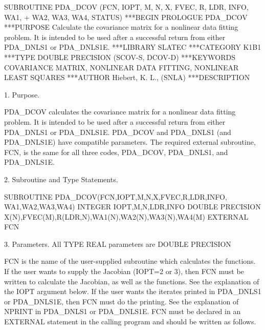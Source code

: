 \documentclass[11pt,twoside,nolof]{starlink}
\begin{document}
\begin{terminalv}
      SUBROUTINE PDA_DCOV (FCN, IOPT, M, N, X, FVEC, R, LDR, INFO, WA1,
     +                     WA2, WA3, WA4, STATUS)
***BEGIN PROLOGUE  PDA_DCOV
***PURPOSE  Calculate the covariance matrix for a nonlinear data
            fitting problem.  It is intended to be used after a
            successful return from either PDA_DNLS1 or PDA_DNLS1E.
***LIBRARY   SLATEC
***CATEGORY  K1B1
***TYPE      DOUBLE PRECISION (SCOV-S, DCOV-D)
***KEYWORDS  COVARIANCE MATRIX, NONLINEAR DATA FITTING,
             NONLINEAR LEAST SQUARES
***AUTHOR  Hiebert, K. L., (SNLA)
***DESCRIPTION

  1. Purpose.

     PDA_DCOV calculates the covariance matrix for a nonlinear data
     fitting problem.  It is intended to be used after a successful
     return from either PDA_DNLS1 or PDA_DNLS1E. PDA_DCOV and
     PDA_DNLS1 (and PDA_DNLS1E) have compatible parameters.  The
     required external subroutine, FCN, is the same for all three
     codes, PDA_DCOV, PDA_DNLS1, and PDA_DNLS1E.

  2. Subroutine and Type Statements.

     SUBROUTINE PDA_DCOV(FCN,IOPT,M,N,X,FVEC,R,LDR,INFO,
                         WA1,WA2,WA3,WA4)
     INTEGER IOPT,M,N,LDR,INFO
     DOUBLE PRECISION X(N),FVEC(M),R(LDR,N),WA1(N),WA2(N),WA3(N),WA4(M)
     EXTERNAL FCN

  3. Parameters. All TYPE REAL parameters are DOUBLE PRECISION

      FCN is the name of the user-supplied subroutine which calculates
         the functions.  If the user wants to supply the Jacobian
         (IOPT=2 or 3), then FCN must be written to calculate the
         Jacobian, as well as the functions.  See the explanation
         of the IOPT argument below.
         If the user wants the iterates printed in PDA_DNLS1 or PDA_DNLS1E,
         then FCN must do the printing.  See the explanation of NPRINT
         in PDA_DNLS1 or PDA_DNLS1E.  FCN must be declared in an EXTERNAL
         statement in the calling program and should be written as
         follows.


\end{terminalv}
\end{document}
